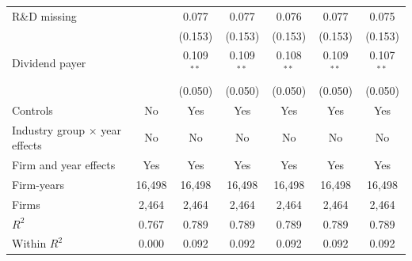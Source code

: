 \begin{tabular}{lcccccc}
R\&D missing &  & 0.077 & 0.077 & 0.076 & 0.077 & 0.075 \\
 &  & (0.153) & (0.153) & (0.153) & (0.153) & (0.153) \\
Dividend payer &  & 0.109$^{**}$ & 0.109$^{**}$ & 0.108$^{**}$ & 0.109$^{**}$ & 0.107$^{**}$ \\
 &  & (0.050) & (0.050) & (0.050) & (0.050) & (0.050) \\
\midrule
Controls & No & Yes & Yes & Yes & Yes & Yes \\
Industry group $\times$ year effects & No & No & No & No & No & No \\
Firm and year effects & Yes & Yes & Yes & Yes & Yes & Yes \\
Firm-years & 16,498 & 16,498 & 16,498 & 16,498 & 16,498 & 16,498 \\
Firms & 2,464 & 2,464 & 2,464 & 2,464 & 2,464 & 2,464 \\
$R^2$ & 0.767 & 0.789 & 0.789 & 0.789 & 0.789 & 0.789 \\
Within $R^2$ & 0.000 & 0.092 & 0.092 & 0.092 & 0.092 & 0.092 \\
\bottomrule
\end{tabular}
